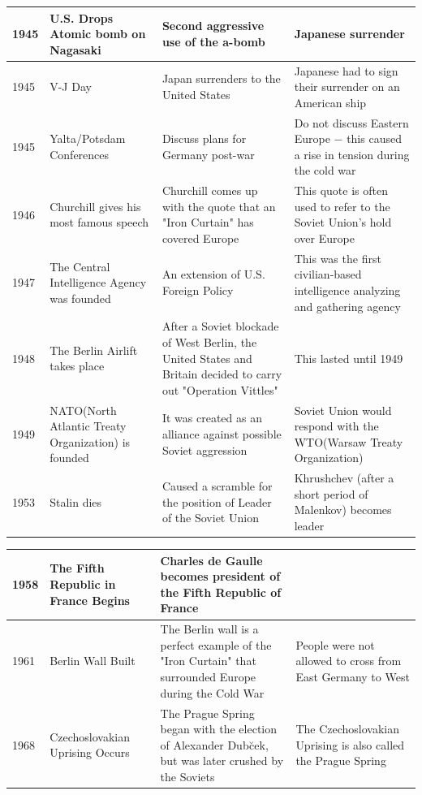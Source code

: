 \documentclass[12pt]{article}
\begin{document}
\begin{enumerate}
\begin{tabular}{|p{}|p{}|p{}|p{}|}
\hline
1945 & U.S. Drops Atomic bomb on Nagasaki  & Second aggressive use of the a-bomb & Japanese surrender  \\
\hline
1945 & V-J Day  & Japan surrenders to the United States  & Japanese had to sign their surrender on an American ship  \\
\hline
1945 & Yalta/Potsdam Conferences  & Discuss plans for Germany post-war  & Do not discuss Eastern Europe $-$ this caused a rise in tension during the cold war  \\
\hline
1946 & Churchill gives his most famous speech  & Churchill comes up with the quote that an "Iron Curtain" has covered Europe  & This quote is often used to refer to the Soviet Union's hold over Europe  \\
\hline
1947 & The Central Intelligence Agency was founded  & An extension of U.S. Foreign Policy & This was the first civilian-based intelligence analyzing and gathering agency  \\
\hline
1948 & The Berlin Airlift takes place  & After a Soviet blockade of West Berlin, the United States and Britain decided to carry out "Operation Vittles"  & This lasted until 1949  \\
\hline
1949 & NATO(North Atlantic Treaty Organization) is founded & It was created as an alliance against possible Soviet aggression & Soviet Union would respond with the WTO(Warsaw Treaty Organization) \\
\hline
1953 & Stalin dies  & Caused a scramble for the position of Leader of the Soviet Union  & Khrushchev (after a short period of Malenkov) becomes leader \\
\hline
\end{tabular}
\newpage
\hspace{-25pt}\begin{tabular}{|p{}|p{}|p{}|p{}|}
\hline
1958 & The Fifth Republic in France Begins  & Charles de Gaulle becomes president of the Fifth Republic of France  & \\
\hline
1961 & Berlin Wall Built  & The Berlin wall is a perfect example of the "Iron Curtain" that surrounded Europe during the Cold War  & People were not allowed to cross from East Germany to West  \\
\hline
1968 & Czechoslovakian Uprising Occurs  & The Prague Spring began with the election of Alexander Dub\u cek, but was later crushed by the Soviets  & The Czechoslovakian Uprising is also called the Prague Spring  \\

\end{tabular}
\end{enumerate}
\end{document}
